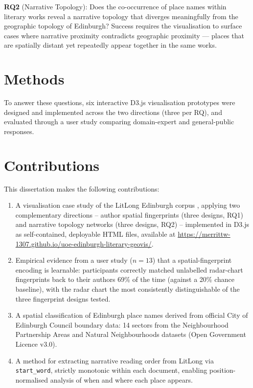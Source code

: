 \documentclass[logo,msc]{infthesis}
\begin{document}
\textbf{RQ2} (Narrative Topology): Does the co-occurrence of place names within literary works reveal a narrative topology that diverges meaningfully from the geographic topology of Edinburgh? Success requires the visualisation to surface cases where narrative proximity contradicts geographic proximity — places that are spatially distant yet repeatedly appear together in the same works.

\section{Methods}
To answer these questions, six interactive D3.js visualisation prototypes were designed and implemented across the two directions (three per RQ), and evaluated through a user study comparing domain-expert and general-public responses.
 
\section{Contributions}
 
This dissertation makes the following contributions:
 
\begin{enumerate}[leftmargin=*, label=\arabic*.]
  \item A visualisation case study of the LitLong Edinburgh corpus
  \cite{anderson2016}, applying two complementary directions -- author
  spatial fingerprints (three designs, RQ1) and narrative topology
  networks (three designs, RQ2) -- implemented in D3.js as
  self-contained, deployable HTML files, available at
  \url{https://merrittw-1307.github.io/uoe-edinburgh-literary-geovis/}.
  \item Empirical evidence from a user study ($n=13$) that a spatial-fingerprint encoding is learnable: participants correctly matched unlabelled radar-chart fingerprints back to their authors 69\% of the time (against a 20\% chance baseline), with the radar chart the most consistently distinguishable of the three fingerprint designs tested.
  \item A spatial classification of Edinburgh place names derived from
  official City of Edinburgh Council boundary data: 14 sectors from the
  Neighbourhood Partnership Areas and Natural Neighbourhoods datasets
  (Open Government Licence v3.0).
  \item A method for extracting narrative reading order from LitLong via
  \texttt{start\_word}, strictly monotonic within each document, enabling
  position-normalised analysis of when and where each place appears.
\end{enumerate}
\end{document}
